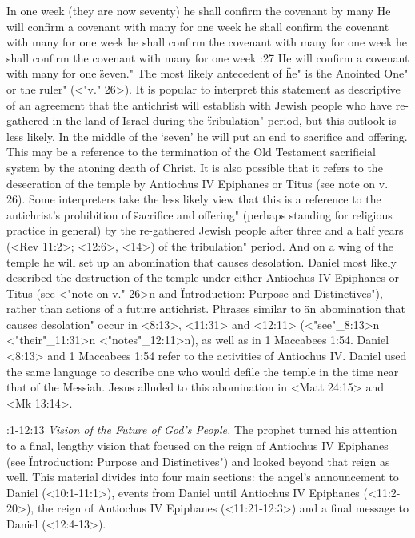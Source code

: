     {In one week (they are now seventy) he shall confirm the covenant by many} %
    {He will confirm a covenant with many for one week} %
    {he shall confirm the covenant with many for one week} %
    {he shall confirm the covenant with many for one week} %
    {he shall confirm the covenant with many for one week} %
:27 {He will confirm a covenant with many for one \"seven."} 
The most likely antecedent of \"he" is \"the Anointed One" or the ruler" (<"v." 26>). It is popular to interpret this statement as descriptive 
of an agreement that the antichrist will establish with Jewish people who have re-gathered in the land of Israel during the \"tribulation" period, but this outlook is less likely. In the middle of the `seven' he will put an end to sacrifice and offering. This may be a reference to the termination of the Old Testament sacrificial system by the atoning death of Christ. It is also possible that it refers to the desecration of the temple by Antiochus IV Epiphanes 
or Titus (see note on v. 26). Some interpreters take the less likely view that this is a reference to the antichrist's prohibition of
 \"sacrifice and offering" (perhaps standing for religious practice in general) by the re-gathered Jewish people after three and a half years  
(<Rev 11:2>; <12:6>, <14>) of the \"tribulation" period. And on a wing of 
the temple he will set up an abomination that causes desolation. Daniel most likely described the
destruction of the temple  under either Antiochus IV Epiphanes or Titus (see <"note on v." 26>n 
and \"Introduction: Purpose and Distinctives"), rather than actions of a future antichrist. Phrases similar to \"an abomination that 
causes desolation" occur in <8:13>, <11:31> and <12:11> (<"see"_8:13>n <"their"_11:31>n <"notes"_12:11>n),  
as well as in 1 Maccabees 1:54. Daniel <8:13> and 1 Maccabees 1:54 refer to the activities of Antiochus IV. Daniel  
used the same language to describe one who would defile the temple in the time near that of the
Messiah. Jesus alluded to this  abomination in <Matt 24:15> and <Mk 13:14>. 

:1-12:13 {} {\it Vision of the Future of God's People.}\/ 
The prophet turned his attention to a final, lengthy vision that focused on the reign of Antiochus IV Epiphanes (see \"Introduction: Purpose and 
Distinctives") and looked beyond that reign as well. This material divides into four main sections: the angel's announcement to Daniel (<10:1-11:1>), events from Daniel until Antiochus IV Epiphanes  (<11:2-20>), the reign of Antiochus IV Epiphanes (<11:21-12:3>) and a final message to Daniel (<12:4-13>).

